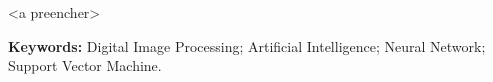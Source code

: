 \captionsenglish

\begin{resumo}
 
<a preencher> 
 
 \vspace{0.5cm}
 
 \textbf{Keywords:} Digital Image Processing; Artificial Intelligence; Neural Network; Support Vector Machine. 
\end{resumo}
\captionsbrazil
